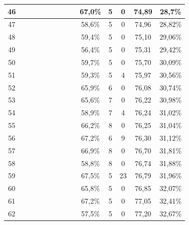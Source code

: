 \begin{longtable}{|c|c|c|c|c|c|c|c|c|c|c|c|c|c|}
46 &  \x    & \x    & \x    & \x    & \x\m  & \x    &       &       & 67,0\% &  5  & 0  & 74,89 & 28,7\% \\ \hline
47 &  \x    & \x    & \x    &       & \x    &       & \x    &       & 58,6\% &  5  & 0  & 74,96 & 28,82\% \\ \hline
48 &  \x    & \x    & \x    & \x    & \x    & \x    & \x    &       & 59,4\% &  5  & 0  & 75,10 & 29,06\% \\ \hline
49 &  \x    & \x    &       & \x    & \x    &       &       & \x    & 56,4\% &  5  & 0  & 75,31 & 29,42\% \\ \hline
50 &  \x    & \x    & \x    & \x    & \x    & \x    & \x\m  &       & 59,7\% &  5  & 0  & 75,70 & 30,09\% \\ \hline
51 &  \x    & \x    & \x    & \x    & \x    &       &       & \x\m  & 59,3\% &  5  & 4  & 75,97 & 30,56\% \\ \hline
52 &  \x    & \x    &       & \x    & \x\m  &       & \x\m  &       & 65,9\% &  6  & 0  & 76,08 & 30,74\% \\ \hline
53 &  \x    & \x    &       & \x    & \x\m  & \x\m  & \x\m  &       & 65,6\% &  7  & 0  & 76,22 & 30,98\% \\ \hline
54 &  \x    & \x    & \x    &       & \x    & \x\m  & \x    &       & 58,9\% &  7  & 4  & 76,24 & 31,02\% \\ \hline
55 &  \x    & \x    & \x    &       & \x\m  &       &       & \x\m  & 66,2\% &  8  & 0  & 76,25 & 31,04\% \\ \hline
56 &  \x    & \x    &       &       & \x\m  &       &       & \x\m  & 67,2\% &  6  & 9  & 76,30 & 31,12\% \\ \hline
57 &  \x    & \x    &       &       & \x\m  & \x\m  &       & \x\m  & 66,9\% &  8  & 0  & 76,70 & 31,81\% \\ \hline
58 &  \x    & \x    & \x    & \x    &       &       &       &       & 58,8\% &  8  & 0  & 76,74 & 31,88\% \\ \hline
59 &  \x    & \x    &       &       & \x\m  &       &       &       & 67,5\% &  5  & 23 & 76,79 & 31,96\% \\ \hline
60 &  \x    & \x    &       & \x    & \x\m  & \x\m  &       &       & 65,8\% &  5  & 0  & 76,85 & 32,07\% \\ \hline
61 &  \x    & \x    &       & \x    & \x\m  &       &       & \x\m  & 67,2\% &  5  & 0  & 77,05 & 32,41\% \\ \hline
62 &  \x    & \x    & \x    & \x    &       & \x    & \x    &       & 57,5\% &  5  & 0  & 77,20 & 32,67\% \\ \hline

\end{longtable}
